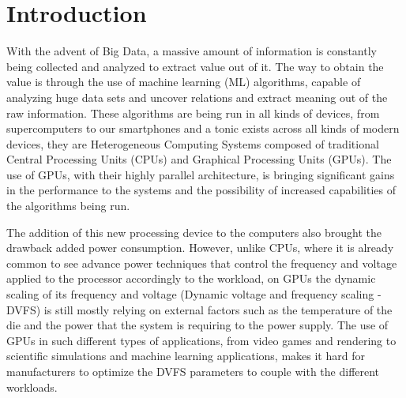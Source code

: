 
\chapter{Introduction}
\label{chapter:introduction}

With the advent of Big Data, a massive amount of information is constantly being collected and analyzed to extract value out of it. The way to obtain the value is through the use of machine learning (ML) algorithms, capable of analyzing huge data sets and uncover relations and extract meaning out of the raw information. These algorithms are being run in all kinds of devices, from supercomputers to our smartphones and a tonic exists across all kinds of modern devices, they are Heterogeneous Computing Systems composed of traditional Central Processing Units (CPUs) and Graphical Processing Units (GPUs). The use of GPUs, with their highly parallel architecture, is bringing significant gains in the performance to the systems and the possibility of increased capabilities of the algorithms being run. 

The addition of this new processing device to the computers also brought the drawback added power consumption. However, unlike CPUs, where it is already common to see advance power techniques that control the frequency and voltage applied to the processor accordingly to the workload, on GPUs the dynamic scaling  of its frequency and voltage (Dynamic voltage and frequency scaling - DVFS) is still mostly relying on external factors such as the temperature of the die and the power that the system is requiring to the power supply. The use of GPUs in such different types of applications, from video games and rendering to scientific simulations and machine learning applications, makes it hard for manufacturers to optimize the DVFS parameters to couple with the different workloads.


